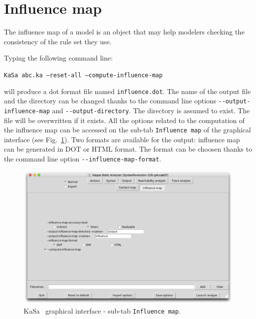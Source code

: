 \documentclass[11pt]{book}
\def\KaSa{\textsf{KaSa}}
\begin{document}
\section{Influence map}

The influence map of a model is an object that may help modelers checking the consistency of the rule set they use.

Typing the following command line:

\texttt{KaSa abc.ka --reset-all --compute-influence-map}

will produce a dot format file named \texttt{influence.dot}.
The name of the output file and the directory can be changed thanks to the command line options \texttt{-{}-output-influence-map} and \texttt{-{}-output-directory}.
The directory is assumed to exist. The file will be overwritten if it exists.  All the options related to the computation of the influence map can be accessed on the sub-tab \texttt{Influence map} of the graphical interface (see Fig.~\ref{fig:kasa:5}). Two formats are available for the output: influence map can be generated in DOT or HTML format. The format can be choosen thanks to the command line option \texttt{-{}-influence-map-format}.

\begin{figure}[htbp]
\centering
\includegraphics[width=12cm]{img/kasa_6.png}
\caption{\KaSa~ graphical interface - sub-tab \texttt{Influence map}.}
\label{fig:kasa:5}
\end{figure}
\end{document}
